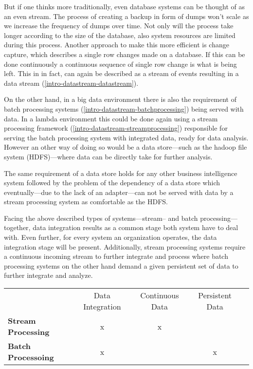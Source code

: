 But if one thinks more traditionally, even database systems can be thought of as
an even stream. The process of creating a backup in form of dumps won't scale as
we increase the frequency of dumps over time. Not only will the process take
longer according to the size of the database, also system resources are limited
during this process. Another approach to make this more efficient is change
capture, which describes a single row changes made on a database. If this can be
done continuously a continuous sequence of single row change is what is being
left. This in in fact, can again be described as a stream of events resulting in a
data stream (\ref{intro-datastream-datastream}).

On the other hand, in a big data environment there is also the requirement of
batch processing systems (\ref{intro-datastream-batchprocessing}) being served
with data. In a lambda environment this could be done again using a stream
processing framework (\ref{intro-datastream-streamprocessing}) responsible for
serving the batch processing system with integrated data, ready for data
analysis. However an other way of doing so would be a data store---such as the
hadoop file system (HDFS)---where data can be directly take for further analysis.

The same requirement of a data store holds for any other business intelligence
system followed by the problem of the dependency of a data store which
eventually---due to the lack of an adapter---can not be served with data by a stream processing 
system as comfortable as the HDFS.

Facing the above described types of systems---stream-- and batch
processing---together, data integration results as a common stage both system have to
deal with. Even further, for every system an organization operates, the data
integration stage will be present. 
Additionally, stream processing systems require a continuous
incoming stream to further integrate and process where batch processing systems
on the other hand demand a given persistent set of data to further integrate and analyze.

\begin{table}[h]
\begin{tabular}{l|c|c|cl}
\multicolumn{1}{c|}{\textbf{}} & Data Integration & Continuous Data & Persistent
Data & \multicolumn{1}{c}{} \\ \cline{1-4}
\textbf{Stream Processing}     & x                & x               &
&                      \\
\textbf{Batch Processoing}     & x                &                 & x
&
\end{tabular}
\end{table}

